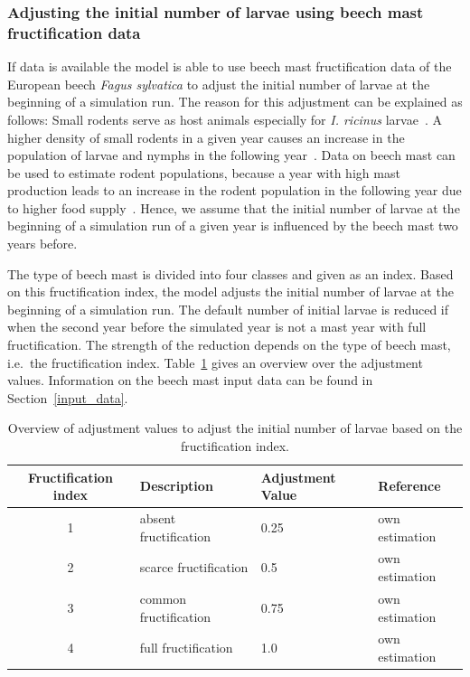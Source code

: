 \documentclass[a4paper, 11pt]{scrartcl}
\begin{document}
\subsubsection{Adjusting the initial number of larvae using beech mast fructification data}\label{subsubsec:initial_larvae_with_beech_mast}
If data is available the model is able to use beech mast fructification data of the European beech \textit{Fagus sylvatica} to adjust the initial number of larvae at the beginning of a simulation run. The reason for this adjustment can be explained as follows: Small rodents serve as host animals especially for \textit{I. ricinus} larvae~\parencite{Cayol.2017}. A higher density of small rodents in a given year causes an increase in the population of larvae and nymphs in the following year~\parencite{Brugger.2018}. Data on beech mast can be used to estimate rodent populations, because a year with high mast production leads to an increase in the rodent population in the following year due to higher food supply~\parencite{Clement.2009}. Hence, we assume that the initial number of larvae at the beginning of a simulation run of a given year is influenced by the beech mast two years before.

The type of beech mast is divided into four classes and given as an index. Based on this fructification index, the model adjusts the initial number of larvae at the beginning of a simulation run. The default number of initial larvae is reduced if when the second year before the simulated year is not a mast year with full fructification. The strength of the reduction depends on the type of beech mast, i.e.\ the fructification index. Table~\ref{tab:fructification_adjustment} gives an overview over the adjustment values. Information on the beech mast input data can be found in Section~\ref{input_data}.

\begin{table}[h!]
\caption[Overview of beech fructification adjustment values for model initialisation.]{Overview of adjustment values to adjust the initial number of larvae based on the fructification index.}
\label{tab:fructification_adjustment}
\begin{tabularx}{\textwidth}{clll}
\toprule
\textbf{Fructification index} & \textbf{Description}    & \textbf{Adjustment Value} & \textbf{Reference} \\
\midrule
1				 	  		  & absent fructification 	& 	0.25 & own estimation \\
2 				 	  		  & scarce fructification	&	0.5	& own estimation  \\
3 					  		  & common fructification	& 	0.75 & own estimation \\
4					 		  & full fructification 	& 	1.0	& own estimation \\
\bottomrule
\end{tabularx}
\end{table}
\end{document}
